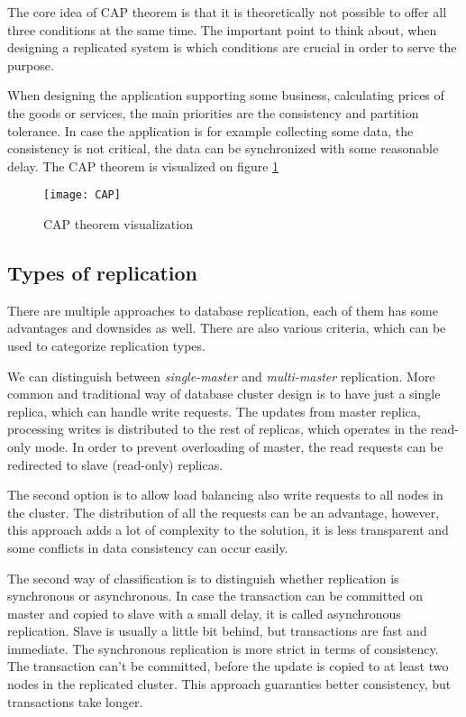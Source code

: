 \documentclass[
  digital, %
  twoside, %
  table,   %
  lof,     %
  lot,     %
]{fithesis3}
\begin{document}
The core idea of CAP theorem is that it is theoretically not possible to offer all three conditions at the same time. The important point to think about, when designing a replicated system is which conditions are crucial in order to serve the purpose.

When designing the application supporting some business, calculating prices of the goods or services, the main priorities are the  consistency and partition tolerance. In case the application is for example collecting some data, the consistency is not critical, the data can be synchronized with some reasonable delay. The CAP theorem is visualized on figure \ref{fig:cap}

\begin{figure}[H]
\caption{CAP theorem visualization}
\centering
\texttt{[image: CAP]}
\label{fig:cap}
\end{figure}

\subsection{Types of replication} \label{sec:types_of_replication}
There are multiple approaches to database replication, each of them has some advantages and downsides as well. There are also various criteria, which can be used to categorize replication types.

We can distinguish between \textit{single-master} and  \textit{multi-master} replication. More common and traditional way of database cluster design is to have just a single replica, which can handle write requests. The updates from master replica, processing writes is distributed to the rest of replicas, which operates in the read-only mode. In order to prevent overloading of master, the read requests can be redirected to slave (read-only) replicas.

The second option is to allow load balancing also write requests to all nodes in the cluster. The distribution of all the requests can be an advantage, however, this approach adds a lot of complexity to the solution, it is less transparent and some conflicts in data consistency can occur easily.

The second way of classification is to distinguish whether replication is synchronous or asynchronous. In case the transaction can be committed on master and copied to slave with a small delay, it is called asynchronous replication. Slave is usually a little bit behind, but transactions are fast and immediate. The synchronous replication is more strict in terms of consistency. The transaction can't be committed, before the update is copied to at least two nodes in the replicated cluster. This approach guaranties better consistency, but transactions take longer.
\end{document}
